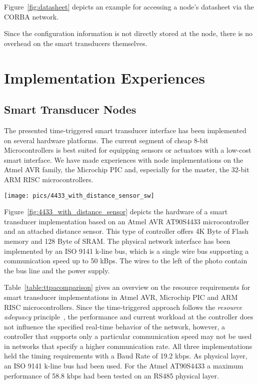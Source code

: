 \documentclass[11pt,a4paper,]{article}
\begin{document}
Figure~\ref{fig:datasheet} depicts an example for accessing a
node's datasheet via the CORBA network.

Since the configuration information is not directly stored at the
node, there is no overhead on the smart transducers themselves.

\section{Implementation Experiences}

\subsection{Smart Transducer Nodes}
\label{sec:smart_transducer_nodes}

The presented time-triggered smart transducer interface has been
implemented on several hardware platforms. The current segment of
cheap 8-bit Microcontrollers is best suited for equipping sensors
or actuators with a low-cost smart interface. We have made
experiences with node implementations on the Atmel AVR family, the
Microchip PIC and, especially for the master, the 32-bit ARM RISC
microcontrollers.

\begin{figure*}[bth]
 \centerline{\texttt{[image: pics/4433\_with\_distance\_sensor\_sw]}}
  \caption{Smart transducer based on Atmel 4433 microcontroller with distance sensor attached (scale in centimeter)}
  \label{fig:4433_with_distance_sensor}
\end{figure*}

Figure~\ref{fig:4433_with_distance_sensor} depicts the hardware of
a smart transducer implementation based on an Atmel AVR AT90S4433
microcontroller and an attached distance sensor. This type of
controller offers 4K Byte of Flash memory and 128 Byte of SRAM.
The physical network interface has been implemented by an ISO 9141
k-line bus, which is a single wire bus supporting a communication
speed up to 50 kBps. The wires to the left of the photo contain
the bus line and the power supply.

Table~\ref{table:ttpacomparison} gives an overview on the resource
requirements for smart transducer implementations in Atmel AVR,
Microchip PIC and ARM RISC microcontrollers.
Since the time-triggered approach follows the {\em resource
adequacy} principle~\cite[p.\,15]{kopetz:97}, the performance and
current workload at the controller does not influence the specified
real-time behavior of the network, however, a controller that
supports only a particular communication speed may not be used in
networks that specify a higher communication rate.
All three implementations held the timing requirements with a Baud
Rate of 19.2 kbps. As physical layer, an ISO 9141 k-line bus had
been used. For the Atmel AT90S4433 a maximum performance of 58.8
kbps had been tested on an RS485 physical layer.
\end{document}
